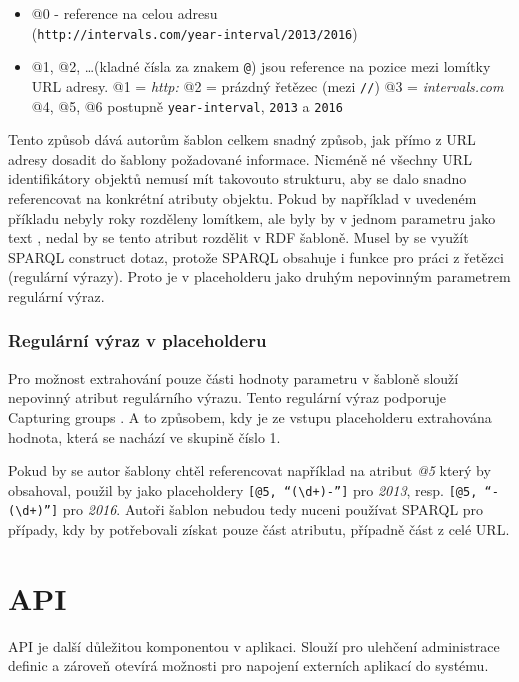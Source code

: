 \documentclass[thesis=B,czech]{FITthesis}[2012/06/26]
\begin{document}
 \begin{itemize}
  \item @0 - reference na celou adresu\\(\texttt{http://intervals.com/year-interval/2013/2016})
  \item @1, @2, \ldots (kladné čísla za znakem \texttt{@}) jsou reference na pozice mezi lomítky URL adresy.
    \subitem @1 = \textit{http:}
    \subitem @2 = prázdný řetězec (mezi \texttt{//})
    \subitem @3 = \textit{intervals.com}
    \subitem @4, @5, @6 postupně \texttt{year-interval}, \texttt{2013} a \texttt{2016}
 \end{itemize}
 Tento způsob dává autorům šablon celkem snadný způsob, jak přímo z URL adresy dosadit do šablony požadované informace. Nicméně né všechny URL identifikátory objektů
 nemusí mít takovouto strukturu, aby se dalo snadno referencovat na konkrétní atributy objektu. Pokud by například v uvedeném příkladu nebyly roky rozděleny lomítkem,
 ale byly by v jednom parametru jako text , nedal by se tento atribut rozdělit v RDF šabloně. Musel by se využít SPARQL construct dotaz, protože
 SPARQL obsahuje i funkce pro práci z řetězci (regulární výrazy). Proto je v placeholderu jako druhým nepovinným parametrem regulární výraz.
 
 \subsubsection{Regulární výraz v placeholderu}
  Pro možnost extrahování pouze části hodnoty parametru v šabloně slouží nepovinný atribut regulárního výrazu. Tento regulární výraz
  podporuje Capturing groups \cite{capture_group}. A to způsobem, kdy je ze vstupu placeholderu extrahována hodnota, která se nachází ve skupině číslo 1.
  
  Pokud by se autor šablony chtěl referencovat například na atribut \textit{@5} který by obsahoval, 
  použil by jako placeholdery \texttt{[@5, ``(\textbackslash d+)-'']} pro \textit{2013}, resp. \texttt{[@5, ``-(\textbackslash d+)'']} pro \textit{2016}.
  Autoři šablon nebudou tedy nuceni používat SPARQL pro případy, kdy by potřebovali získat pouze část atributu, případně část z celé URL.
  
  \section{API}\label{api}
  API je další důležitou komponentou v aplikaci. Slouží pro ulehčení administrace definic a zároveň otevírá možnosti pro napojení externích
  aplikací do systému. 
  
\end{document}
